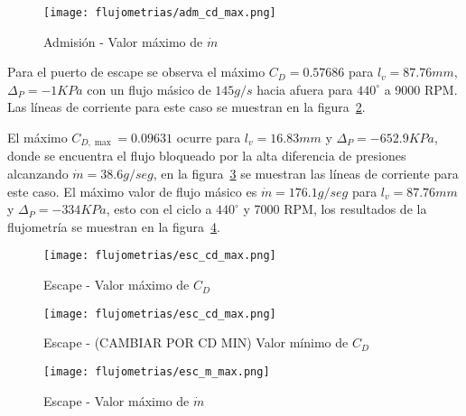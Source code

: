 \begin{figure}[ht]
    \centering
    \texttt{[image: flujometrias/adm\_cd\_max.png]}
    \caption{Admisión - Valor máximo de $\dot{m}$}\label{fig:adm_m_max}
\end{figure}

Para el puerto de escape se observa el máximo $C_{D}=0.57686$ para
$l_{v}=87.76 mm$, $\Delta_{P}=-1 KPa$ con un flujo másico de $145 g/s$
hacia afuera para $440^{\circ}$ a 9000 RPM.
%
Las líneas de corriente para este caso se muestran en la
figura~\ref{fig:esc_cd_max}.

El máximo $C_{D, \max}=0.09631$ ocurre para $l_{v}=16.83 mm$ y
$\Delta_{P}=-652.9 KPa$, donde se encuentra el flujo bloqueado por la alta
diferencia de presiones alcanzando $\dot{m}=38.6 g/seg$, en la
figura~\ref{fig:esc_cd_min} se muestran las líneas de corriente para este caso.
%
El máximo valor de flujo másico es $\dot{m}=176.1 g/seg$ para $l_{v}=87.76 mm$ y
$\Delta_{P}=-334 KPa$, esto con el ciclo a $440^{\circ}$ y 7000 RPM, los
resultados de la flujometría se muestran en la figura~\ref{fig:esc_m_max}.

\begin{figure}[ht]
    \centering
    \texttt{[image: flujometrias/esc\_cd\_max.png]}
    \caption{Escape - Valor máximo de $C_{D}$}\label{fig:esc_cd_max}
\end{figure}

\begin{figure}[ht]
    \centering
    \texttt{[image: flujometrias/esc\_cd\_max.png]}
    \caption{Escape - (CAMBIAR POR CD MIN) Valor mínimo de $C_{D}$}\label{fig:esc_cd_min}
\end{figure}

\begin{figure}[ht]
    \centering
    \texttt{[image: flujometrias/esc\_m\_max.png]}
    \caption{Escape - Valor máximo de $\dot{m}$}\label{fig:esc_m_max}
\end{figure}


